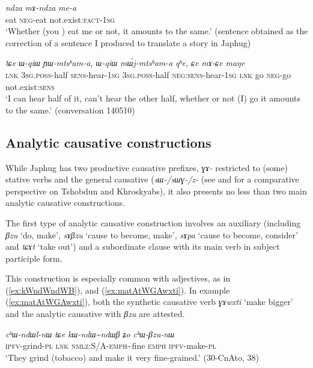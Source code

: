 \documentclass[oneside,a4paper,11pt]{article}
\newcommand{\ipa}[1]{\textit{\phon#1}}
\newcommand{\jpg}[2]{\ipa{#1} `#2'}
\newcommand{\tld}{\textasciitilde{}}
\newcommand{\refb}[1]{(\ref{#1})}
\begin{document}
\begin{exe}
\ex \label{ndza.mea}
\gll \ipa{ndza} 	\ipa{mɤ-ndza} 	\ipa{me-a} \\
eat \textsc{neg}-eat not.exist:\textsc{fact}-\textsc{1sg} \\
\glt `Whether (you ) eat me or not, it amounts to the same.' (sentence obtained as the correction of a sentence I produced to translate a story in Japhug)
\end{exe}

\begin{exe}
\ex \label{mACe.me}
\gll
\ipa{tɕe} 	\ipa{ɯ-qiɯ} 	\ipa{ɲɯ-mtsʰam-a,} 	\ipa{ɯ-qiɯ} 	\ipa{mɯ́j-mtsʰam-a} 	\ipa{qʰe,} 	\ipa{ɕe} 	\ipa{mɤ-ɕe} 	\ipa{maŋe}  \\
\textsc{lnk} \textsc{3sg.poss}-half \textsc{sens}-hear-\textsc{1sg} \textsc{3sg.poss}-half \textsc{neg:sens}-hear-\textsc{1sg} \textsc{lnk} go \textsc{neg}-go not.exist:\textsc{sens} \\
\glt `I can hear half of it, can't hear the other half, whether or not (I) go it amounts to the same.' (conversation 140510)
\end{exe}
\subsection{Analytic causative constructions}
While Japhug has two productive causative prefixes, \ipa{ɣɤ-} restricted to (some) stative verbs and the general causative (\ipa{sɯ-/sɯɣ-/z-} (see \citealt{jacques15causative} and \citealt{jackson14morpho, lai14caus} for a comparative perspective on Tshobdun and Khroskyabs), it also presents no less than two main analytic causative constructions.

The first type of analytic causative construction involves an auxiliary (including \jpg{βzu}{do, make}, \jpg{sɤβzu}{cause to become, make},  \jpg{sɤpa}{cause to become, consider} and \jpg{tɕɤt}{take out}) and a subordinate clause with its main verb in subject participle form. 

This construction is especially common with adjectives, as in \refb{ex:kWndWndWB}, and \refb{ex:matAtWGAwxti}. In example \refb{ex:matAtWGAwxti}, both the synthetic causative verb \jpg{ɣɤwxti}{make bigger} and the analytic causative  with \ipa{βzu} are attested. 

    \begin{exe}
\ex  \label{ex:kWndWndWB}
\gll 
    \ipa{cʰɯ-ndɯl-nɯ} 	\ipa{tɕe} 	\ipa{kɯ-ndɯ\tld{}ndɯβ} 	\ipa{ʑo} 	\ipa{cʰɯ-βzu-nɯ}  \\
\textsc{ipfv}-grind-\textsc{pl} \textsc{lnk} \textsc{nmlz:S/A-emph}\tld{}fine \textsc{emph} \textsc{ipfv}-make-\textsc{pl} \\
\glt `They grind (tobacco) and make it very fine-grained.' (30-CnAto, 38)
   \end{exe}
   
\end{document}

